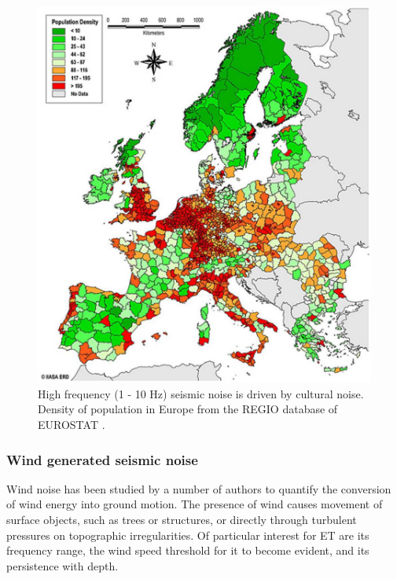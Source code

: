 \begin{figure}[t!]
	\begin{center}
		 \includegraphics[width=12cm]{./Sec_SiteInfra/Figures/population.pdf}
		\caption{High frequency (1 - 10 Hz) seismic noise is driven by cultural noise. Density of population in Europe from the REGIO database of EUROSTAT \cite{eurostat}.}
	\label{fig3.4}
	\end{center}
\end{figure}

\FloatBarrier
\subsubsection*{Wind generated seismic noise}
Wind noise has been studied by a number of authors to quantify the conversion of wind energy into ground motion. The presence of wind causes movement of surface objects, such as trees or structures, or directly through turbulent pressures on topographic irregularities. Of particular interest for ET are its frequency range, the wind speed threshold for it to become evident, and its persistence with depth. 

